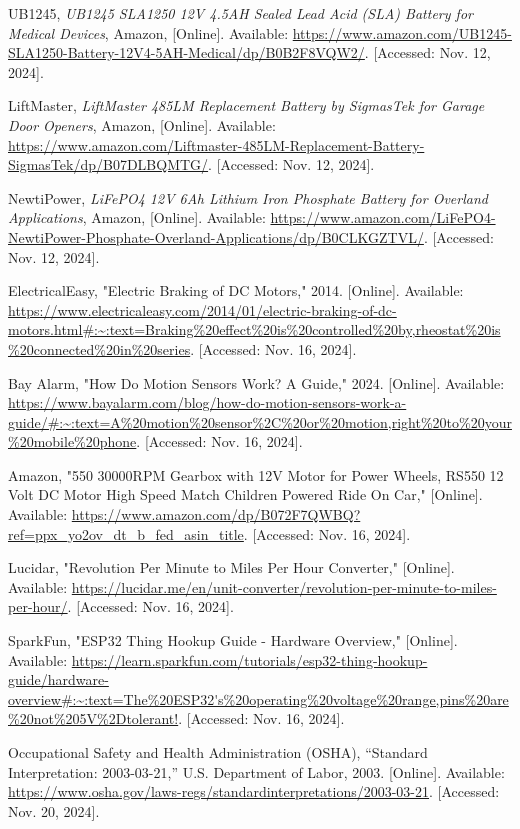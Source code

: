 \begin{thebibliography}{45}
	UB1245, \textit{UB1245 SLA1250 12V 4.5AH Sealed Lead Acid (SLA) Battery for Medical Devices}, Amazon, [Online]. Available: \url{https://www.amazon.com/UB1245-SLA1250-Battery-12V4-5AH-Medical/dp/B0B2F8VQW2/}. [Accessed: Nov. 12, 2024].
	
	LiftMaster, \textit{LiftMaster 485LM Replacement Battery by SigmasTek for Garage Door Openers}, Amazon, [Online]. Available: \url{https://www.amazon.com/Liftmaster-485LM-Replacement-Battery-SigmasTek/dp/B07DLBQMTG/}. [Accessed: Nov. 12, 2024].
	
	NewtiPower, \textit{LiFePO4 12V 6Ah Lithium Iron Phosphate Battery for Overland Applications}, Amazon, [Online]. Available: \url{https://www.amazon.com/LiFePO4-NewtiPower-Phosphate-Overland-Applications/dp/B0CLKGZTVL/}. [Accessed: Nov. 12, 2024].
	
	 ElectricalEasy, "Electric Braking of DC Motors," 2014. [Online]. Available: \url{https://www.electricaleasy.com/2014/01/electric-braking-of-dc-motors.html#:~:text=Braking%20effect%20is%20controlled%20by,rheostat%20is%20connected%20in%20series}. [Accessed: Nov. 16, 2024]. 
	
	 Bay Alarm, "How Do Motion Sensors Work? A Guide," 2024. [Online]. Available: \url{https://www.bayalarm.com/blog/how-do-motion-sensors-work-a-guide/#:~:text=A%20motion%20sensor%2C%20or%20motion,right%20to%20your%20mobile%20phone}. [Accessed: Nov. 16, 2024]. 
	
	Amazon, "550 30000RPM Gearbox with 12V Motor for Power Wheels, RS550 12 Volt DC Motor High Speed Match Children Powered Ride On Car," [Online]. Available: \url{https://www.amazon.com/dp/B072F7QWBQ?ref=ppx_yo2ov_dt_b_fed_asin_title}. [Accessed: Nov. 16, 2024].
	
	Lucidar, "Revolution Per Minute to Miles Per Hour Converter," [Online]. Available: \url{https://lucidar.me/en/unit-converter/revolution-per-minute-to-miles-per-hour/}. [Accessed: Nov. 16, 2024].
	
	SparkFun, "ESP32 Thing Hookup Guide - Hardware Overview," [Online]. Available: \url{https://learn.sparkfun.com/tutorials/esp32-thing-hookup-guide/hardware-overview#:~:text=The%20ESP32's%20operating%20voltage%20range,pins%20are%20not%205V%2Dtolerant!}. [Accessed: Nov. 16, 2024].
	
	Occupational Safety and Health Administration (OSHA), ``Standard Interpretation: 2003-03-21,'' U.S. Department of Labor, 2003. [Online]. Available: \url{https://www.osha.gov/laws-regs/standardinterpretations/2003-03-21}. [Accessed: Nov. 20, 2024].
	

\end{thebibliography}
